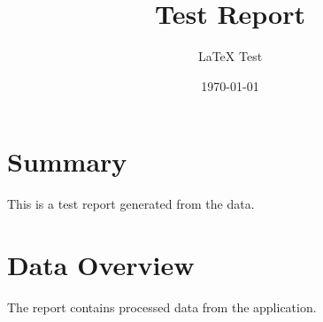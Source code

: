 \documentclass{article}
\title{Test Report}
\author{LaTeX Test}
\date{\today}
\begin{document}
\maketitle
\section{Summary}
This is a test report generated from the data.
\section{Data Overview}
The report contains processed data from the application.
\end{document}
